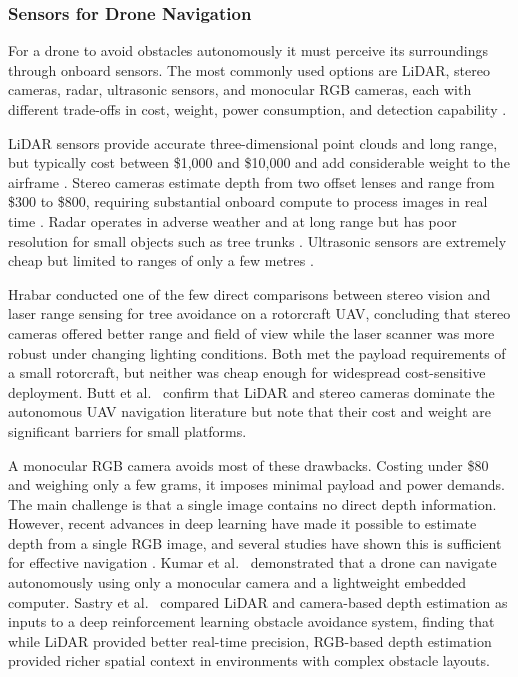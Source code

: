 \documentclass[../main.tex]{subfiles}
\begin{document}


\subsubsection{Sensors for Drone Navigation}

For a drone to avoid obstacles autonomously it must perceive its surroundings through onboard sensors. The most commonly used options are LiDAR, stereo cameras, radar, ultrasonic sensors, and monocular RGB cameras, each with different trade-offs in cost, weight, power consumption, and detection capability \cite{Butt2024,Hrabar2012}.

LiDAR sensors provide accurate three-dimensional point clouds and long range, but typically cost between \$1,000 and \$10,000 and add considerable weight to the airframe \cite{Butt2024,Hrabar2012}. Stereo cameras estimate depth from two offset lenses and range from \$300 to \$800, requiring substantial onboard compute to process images in real time \cite{Hrabar2012}. Radar operates in adverse weather and at long range but has poor resolution for small objects such as tree trunks \cite{Butt2024}. Ultrasonic sensors are extremely cheap but limited to ranges of only a few metres \cite{Butt2024}.

Hrabar \cite{Hrabar2012} conducted one of the few direct comparisons between stereo vision and laser range sensing for tree avoidance on a rotorcraft UAV, concluding that stereo cameras offered better range and field of view while the laser scanner was more robust under changing lighting conditions. Both met the payload requirements of a small rotorcraft, but neither was cheap enough for widespread cost-sensitive deployment. Butt et al.\ \cite{Butt2024} confirm that LiDAR and stereo cameras dominate the autonomous UAV navigation literature but note that their cost and weight are significant barriers for small platforms.

A monocular RGB camera avoids most of these drawbacks. Costing under \$80 and weighing only a few grams, it imposes minimal payload and power demands. The main challenge is that a single image contains no direct depth information. However, recent advances in deep learning have made it possible to estimate depth from a single RGB image, and several studies have shown this is sufficient for effective navigation \cite{Kumar2023,Sastry2025,Kalidas2023}. Kumar et al.\ \cite{Kumar2023} demonstrated that a drone can navigate autonomously using only a monocular camera and a lightweight embedded computer. Sastry et al.\ \cite{Sastry2025} compared LiDAR and camera-based depth estimation as inputs to a deep reinforcement learning obstacle avoidance system, finding that while LiDAR provided better real-time precision, RGB-based depth estimation provided richer spatial context in environments with complex obstacle layouts.
\end{document}
